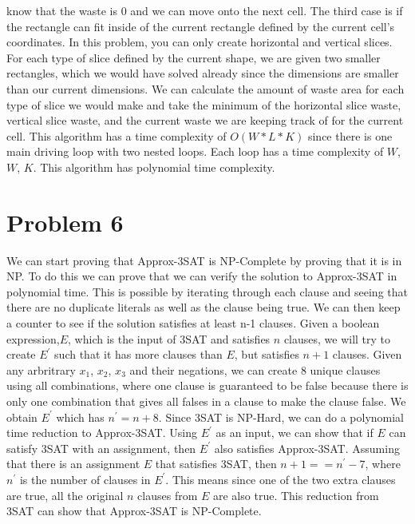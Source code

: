 \documentclass[12pt]{article}
\begin{document}
know that the waste is 0 and we can move onto the next cell. The third case is if the rectangle can fit
inside of the current rectangle defined by the current cell's coordinates. In this problem, you can only 
create horizontal and vertical slices. For each type of slice defined by the current shape, we are given 
two smaller rectangles, which we would have solved already since the dimensions are smaller than our current 
dimensions. We can calculate the amount of waste area for each type of slice we would make and take the minimum 
of the horizontal slice waste, vertical slice waste, and the current waste we are keeping track of for the
current cell. 
\newline
\newline
This algorithm has a time complexity of $O(W * L * K)$ since there is one main driving loop with two nested 
loops. Each loop has a time complexity of $W$, $W$, $K$. This algorithm has polynomial time complexity.

\newpage
\section*{Problem 6}
We can start proving that Approx-3SAT is NP-Complete by proving that it is in NP. To do this we can 
prove that we can verify the solution to Approx-3SAT in polynomial time. This is possible by iterating through 
each clause and seeing that there are no duplicate literals as well as the clause being true. We can
then keep a counter to see if the solution satisfies at least n-1 clauses.
\newline
\newline
Given a boolean expression,$E$, which is the input of 3SAT and satisfies $n$ clauses,  we will try to create $E^\prime$ such that it has more clauses than $E$, but satisfies $n + 1$ clauses. 
Given any arbritrary $x_1$, $x_2$, $x_3$ and their negations, we can create 8 unique clauses using all combinations, where one clause is guaranteed to be false because there is only one combination
that gives all falses in a clause to make the clause false. We obtain $E^\prime$ which has $n^\prime = n + 8$.
\newline
\newline
Since 3SAT is NP-Hard, we can do a polynomial time reduction to Approx-3SAT. Using $E^\prime$ as an input, we can show that if $E$ can satisfy 
3SAT with an assignment, then $E^\prime$ also satisfies Approx-3SAT. Assuming that there is an assignment $E$ that satisfies 3SAT, then 
$n + 1 == n^\prime - 7$, where $n^\prime$ is the number of clauses in $E^\prime$. This means since one of the two extra clauses are true, 
all the original $n$ clauses from $E$ are also true.
\newline
\newline
This reduction from 3SAT can show that Approx-3SAT is NP-Complete.
\end{document}
